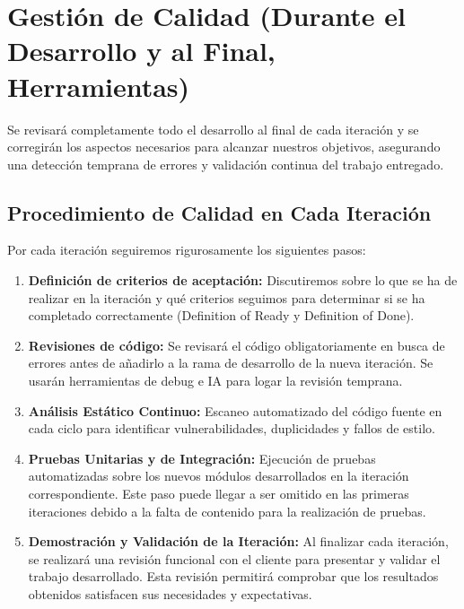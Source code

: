 \section{Gestión de Calidad (Durante el Desarrollo y al Final, Herramientas)}

Se revisará completamente todo el desarrollo al final de cada iteración y se corregirán los aspectos necesarios para alcanzar nuestros objetivos, asegurando una detección temprana de errores y validación continua del trabajo entregado.

\subsection{Procedimiento de Calidad en Cada Iteración}
Por cada iteración seguiremos rigurosamente los siguientes pasos:
\begin{enumerate}[leftmargin=*]
  \item \textbf{Definición de criterios de aceptación:} Discutiremos sobre lo que se ha de realizar en la iteración y qué criterios seguimos para determinar si se ha completado correctamente (Definition of Ready y Definition of Done).
  \item \textbf{Revisiones de código:} Se revisará el código obligatoriamente en busca de errores antes de añadirlo a la rama de desarrollo de la nueva iteración. Se usarán herramientas de debug e  IA para logar la revisión temprana.
  \item \textbf{Análisis Estático Continuo:} Escaneo automatizado del código fuente en cada ciclo para identificar vulnerabilidades, duplicidades y fallos de estilo.
  \item \textbf{Pruebas Unitarias y de Integración:} Ejecución de pruebas automatizadas sobre los nuevos módulos desarrollados en la iteración correspondiente. Este paso puede llegar a ser omitido en las primeras iteraciones debido a la falta de contenido para la realización de pruebas.
  \item \textbf{Demostración y Validación de la Iteración:} Al finalizar cada iteración, se realizará una revisión funcional con el cliente para presentar y validar el trabajo desarrollado. Esta revisión permitirá comprobar que los resultados obtenidos satisfacen sus necesidades y expectativas.
\end{enumerate}

